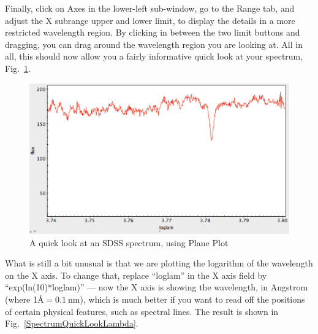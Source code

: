 \documentclass[twocolumn,apj]{openjournal}
\begin{document}
Finally, click on Axes in the lower-left sub-window, go to the Range tab, and adjust the X subrange upper and lower limit, to display the details in a more restricted wavelength region. By clicking in between the two limit buttons and dragging, you can drag around the wavelength region you are looking at. All in all, this should now allow you a fairly informative quick look at your spectrum, Fig.~\ref{SpectrumQuickLook}.
\begin{figure}[htbp]
\begin{center}
\includegraphics[width=\linewidth]{spectrum-quicklook.jpg}
\caption{A quick look at an SDSS spectrum, using Plane Plot}
\label{SpectrumQuickLook}
\end{center}
\end{figure}
What is still a bit unusual is that we are plotting the logarithm of the wavelength on the X axis. To change that, replace ``loglam'' in the X axis field by ``exp(ln(10)*loglam)'' --- now the X axis is showing the wavelength, in Angstrom (where 1\AA $= 0.1\:\mbox{nm}$), which is much better if you want to read off the positions of certain physical features, such as spectral lines. The result is shown in Fig.~\ref{SpectrumQuickLookLambda}.
\end{document}
